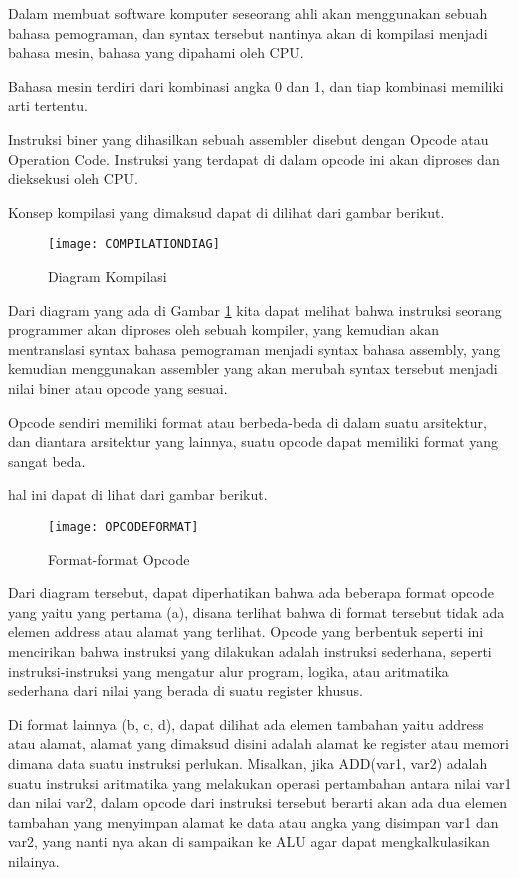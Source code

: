 Dalam membuat software komputer seseorang ahli akan menggunakan sebuah bahasa
pemograman, dan syntax tersebut nantinya akan di kompilasi menjadi bahasa
mesin, bahasa yang dipahami oleh CPU.

Bahasa mesin terdiri dari kombinasi angka 0 dan 1, dan tiap kombinasi memiliki
arti tertentu.

Instruksi biner yang dihasilkan sebuah assembler disebut dengan Opcode atau Operation Code.
Instruksi yang terdapat di dalam opcode ini akan diproses dan dieksekusi oleh CPU.

Konsep kompilasi yang dimaksud dapat di dilihat dari gambar berikut.

\begin{figure}[h!]
    \centering
    \texttt{[image: COMPILATIONDIAG]}
    \caption{Diagram Kompilasi}
    \label{fig:COMPILATIONDIAG}
\end{figure}

Dari diagram yang ada di Gambar \ref{fig:COMPILATIONDIAG} kita dapat melihat
bahwa instruksi seorang programmer akan diproses oleh sebuah kompiler, yang
kemudian akan mentranslasi syntax bahasa pemograman menjadi syntax bahasa assembly,
yang kemudian menggunakan assembler yang akan merubah syntax tersebut menjadi
nilai biner atau opcode yang sesuai.

Opcode sendiri memiliki format atau berbeda-beda di dalam suatu arsitektur, dan
diantara arsitektur yang lainnya, suatu opcode dapat memiliki format yang sangat beda.

\newpage

hal ini dapat di lihat dari gambar berikut.

\begin{figure}[h]
    \centering
    \texttt{[image: OPCODEFORMAT]}
    \caption{Format-format Opcode}
    \label{fig:OPCODEFORMAT}
\end{figure}

Dari diagram tersebut, dapat diperhatikan bahwa ada beberapa format opcode yang
yaitu yang pertama (a), disana terlihat bahwa di format tersebut tidak ada elemen
address atau alamat yang terlihat. Opcode yang berbentuk seperti ini mencirikan bahwa
instruksi yang dilakukan adalah instruksi sederhana, seperti instruksi-instruksi
yang mengatur alur program, logika, atau aritmatika sederhana dari nilai yang
berada di suatu register khusus.

Di format lainnya (b, c, d), dapat dilihat ada elemen tambahan yaitu address atau alamat,
alamat yang dimaksud disini adalah alamat ke register atau memori dimana data suatu
instruksi perlukan. Misalkan, jika ADD(var1, var2) adalah suatu instruksi aritmatika
yang melakukan operasi pertambahan antara nilai var1 dan nilai var2, dalam opcode
dari instruksi tersebut berarti akan ada dua elemen tambahan yang menyimpan alamat
ke data atau angka yang disimpan var1 dan var2, yang nanti nya akan di sampaikan ke
ALU agar dapat mengkalkulasikan nilainya.

